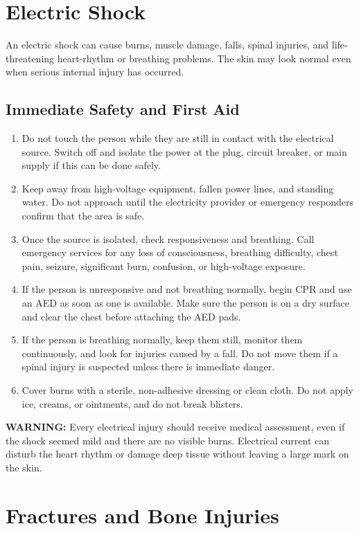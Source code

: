 \section{Electric Shock}

An electric shock can cause burns, muscle damage, falls, spinal injuries, and
life-threatening heart-rhythm or breathing problems. The skin may look normal
even when serious internal injury has occurred.

\subsection{Immediate Safety and First Aid}

\begin{enumerate}[leftmargin=*]
  \item Do not touch the person while they are still in contact with the electrical source. Switch off and isolate the power at the plug, circuit breaker, or main supply if this can be done safely.
  \item Keep away from high-voltage equipment, fallen power lines, and standing water. Do not approach until the electricity provider or emergency responders confirm that the area is safe.
  \item Once the source is isolated, check responsiveness and breathing. Call emergency services for any loss of consciousness, breathing difficulty, chest pain, seizure, significant burn, confusion, or high-voltage exposure.
  \item If the person is unresponsive and not breathing normally, begin CPR and use an AED as soon as one is available. Make sure the person is on a dry surface and clear the chest before attaching the AED pads.
  \item If the person is breathing normally, keep them still, monitor them continuously, and look for injuries caused by a fall. Do not move them if a spinal injury is suspected unless there is immediate danger.
  \item Cover burns with a sterile, non-adhesive dressing or clean cloth. Do not apply ice, creams, or ointments, and do not break blisters.
\end{enumerate}

\textbf{WARNING:} Every electrical injury should receive medical assessment,
even if the shock seemed mild and there are no visible burns. Electrical
current can disturb the heart rhythm or damage deep tissue without leaving a
large mark on the skin.

\section{Fractures and Bone Injuries}

